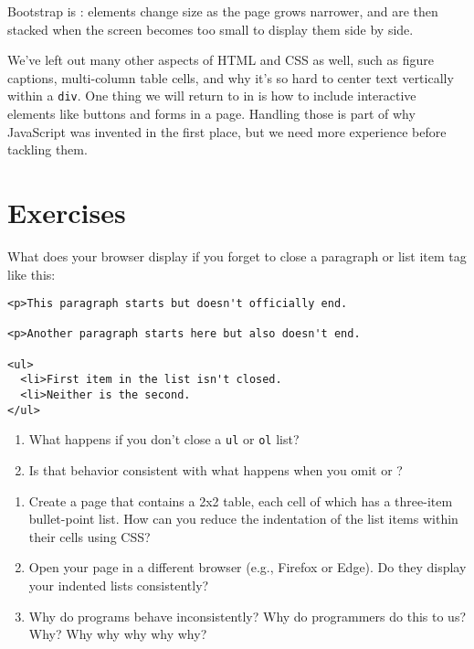 Bootstrap is :
elements change size as the page grows narrower,
and are then stacked when the screen becomes too small to display them side by side.

We've left out many other aspects of HTML and CSS as well,
such as figure captions,
multi-column table cells,
and why it's so hard to center text vertically within a \texttt{div}.
One thing we will return to in  is
how to include interactive elements like buttons and forms in a page.
Handling those is part of why JavaScript was invented in the first place,
but we need more experience before tackling them.

\section{Exercises}\label{s:htmlcss-exercises}


What does your browser display if you forget to close a paragraph or list item tag
like this:

\begin{verbatim}
<p>This paragraph starts but doesn't officially end.

<p>Another paragraph starts here but also doesn't end.

<ul>
  <li>First item in the list isn't closed.
  <li>Neither is the second.
</ul>
\end{verbatim}

\begin{enumerate}
\item
  What happens if you don't close a \texttt{ul} or \texttt{ol} list?
\item
  Is that behavior consistent with what happens when you omit \texttt{} or \texttt{}?
\end{enumerate}


\begin{enumerate}
\item
  Create a page that contains a 2x2 table,
  each cell of which has a three-item bullet-point list.
  How can you reduce the indentation of the list items within their cells using CSS?
\item
  Open your page in a different browser (e.g., Firefox or Edge).
  Do they display your indented lists consistently?
\item
  Why do programs behave inconsistently?
  Why do programmers do this to us?
  Why?
  Why why why why why?
\end{enumerate}


